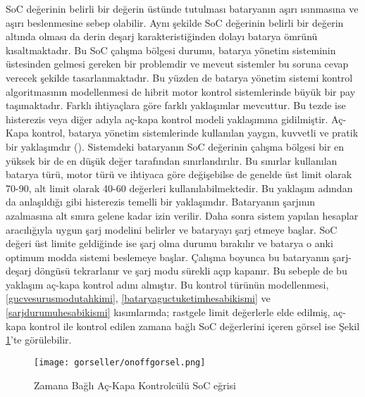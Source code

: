 SoC değerinin belirli bir değerin üstünde tutulması bataryanın aşırı ısınmasına ve aşırı beslenmesine sebep olabilir. Aynı şekilde SoC değerinin belirli bir değerin altında olması da derin deşarj karakteristiğinden dolayı batarya ömrünü kısaltmaktadır.
Bu SoC çalışma bölgesi durumu, batarya yönetim sisteminin üstesinden gelmesi gereken bir problemdir ve mevcut sistemler bu soruna cevap verecek şekilde tasarlanmaktadır. Bu yüzden de batarya yönetim sistemi kontrol algoritmasının modellenmesi de hibrit motor kontrol sistemlerinde 
büyük bir pay taşımaktadır. Farklı ihtiyaçlara göre farklı yaklaşımlar mevcuttur. Bu tezde ise histerezis veya diğer adıyla aç-kapa kontrol modeli yaklaşımına gidilmiştir. Aç-Kapa kontrol, batarya yönetim sistemlerinde kullanılan yaygın, kuvvetli ve pratik bir yaklaşımdır (\cite{soconoffref}). 
Sistemdeki bataryanın SoC değerinin çalışma bölgesi bir en yüksek bir de en düşük değer tarafından sınırlandırılır. Bu sınırlar kullanılan batarya türü, motor türü ve ihtiyaca göre değişebilse de genelde üst limit olarak 70-90, alt limit olarak 40-60 değerleri kullanılabilmektedir.
Bu yaklaşım adından da anlaşıldığı gibi histerezis temelli bir yaklaşımdır. Bataryanın şarjının azalmasına alt sınıra gelene kadar izin verilir. Daha sonra sistem yapılan hesaplar aracılığıyla uygun şarj modelini belirler ve bataryayı şarj etmeye başlar. SoC değeri üst limite geldiğinde ise şarj olma durumu bırakılır ve batarya o anki optimum modda sistemi beslemeye başlar.
Çalışma boyunca bu bataryanın şarj-deşarj döngüsü tekrarlanır ve şarj modu sürekli açıp kapanır. Bu sebeple de bu yaklaşım aç-kapa kontrol adını almıştır. Bu kontrol türünün modellenmesi, \ref{gucvesurusmodutahkimi}, \ref{bataryaguctuketimhesabikismi} ve \ref{sarjdurumuhesabikismi} kısımlarında; rastgele limit değerlerle elde edilmiş, aç-kapa kontrol ile kontrol edilen zamana bağlı SoC değerlerini içeren görsel ise Şekil \ref{fig:onoffgorsel}'te görülebilir.

\begin{figure}[h]
    \centering
    \texttt{[image: gorseller/onoffgorsel.png]}
    \caption{Zamana Bağlı Aç-Kapa Kontrolcülü SoC eğrisi}\label{fig:onoffgorsel}
\end{figure}
